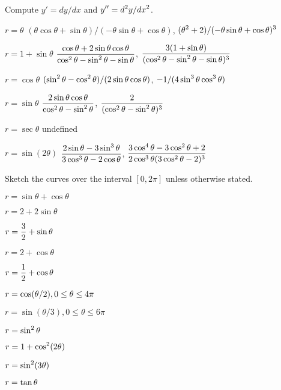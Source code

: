 \exercises

\noindent Compute $y'=dy/dx$ and $\displaystyle y''=d^2y/dx^2$.

\twocol

\exercise $r=\theta$
\answer$(\theta\cos\theta+\sin\theta)/(-\theta\sin\theta+\cos\theta)$,
$\displaystyle (\theta^2+2)/(-\theta\sin\theta+\cos\theta)^3$
\endanswer
\endexercise

\exercise $r=1+\sin\theta$
\answer $\displaystyle {\cos\theta+2\sin\theta\cos\theta\over
\cos^2\theta-\sin^2\theta-\sin\theta}$,
$\displaystyle {3(1+\sin\theta)\over(\cos^2\theta-\sin^2\theta-\sin\theta)^3}$
\endanswer
\endexercise

\exercise $r=\cos\theta$
\answer $\displaystyle (\sin^2\theta-\cos^2\theta)/(2\sin\theta\cos\theta)$,
$\displaystyle -1/(4\sin^3\theta\cos^3\theta)$
\endanswer
\endexercise

\exercise $r=\sin\theta$
\answer $\displaystyle {2\sin\theta\cos\theta\over\cos^2\theta-\sin^2\theta}$,
$\displaystyle {2\over(\cos^2\theta-\sin^2\theta)^3}$
\endanswer
\endexercise

\exercise $r=\sec\theta$
\answer undefined
\endanswer
\endexercise

\exercise $r=\sin(2\theta)$
\answer $\displaystyle {2\sin\theta-3\sin^3\theta\over3\cos^3\theta-2\cos\theta}$,
$\displaystyle {3\cos^4\theta-3\cos^2\theta+2\over2\cos^3\theta(3\cos^2\theta-2)^3}$
\endanswer

\endtwocol

\bigbreak
\noindent Sketch the curves over the interval $[0,2\pi]$ unless
otherwise stated.

\twocol
\endexercise

\exercise $r=\sin\theta+\cos\theta$
\endexercise

\exercise $r=2+2\sin\theta$
\endexercise

\exercise $\displaystyle r={3\over2}+\sin\theta$
\endexercise

\exercise $r= 2+\cos\theta$
\endexercise

\exercise $\displaystyle r={1\over2}+\cos\theta$
\endexercise

\exercise $\displaystyle r=\cos(\theta/2), 0\le\theta\le4\pi$
\endexercise

\exercise $r=\sin(\theta/3), 0\le\theta\le6\pi$
\endexercise

\exercise $\displaystyle r=\sin^2\theta$
\endexercise

\exercise $\displaystyle r=1+\cos^2(2\theta)$
\endexercise

\exercise $\displaystyle r=\sin^2(3\theta)$
\endexercise

\exercise $\displaystyle r=\tan\theta$
\endexercise

